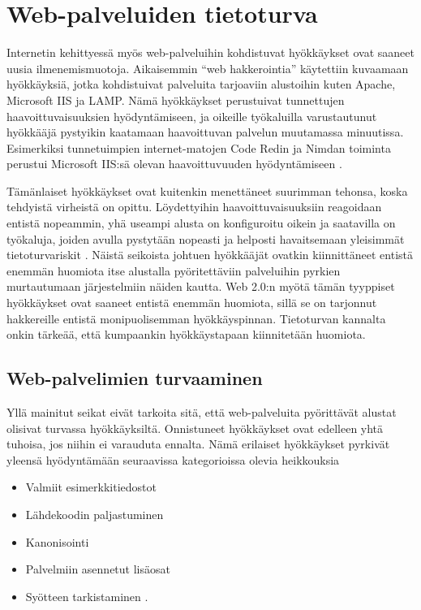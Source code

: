 \section{Web-palveluiden tietoturva}

Internetin kehittyessä myös web-palveluihin kohdistuvat hyökkäykset ovat saaneet
uusia ilmenemismuotoja. Aikaisemmin ``web hakkerointia'' käytettiin kuvaamaan
hyökkäyksiä, jotka kohdistuivat palveluita tarjoaviin alustoihin kuten Apache, 
Microsoft IIS ja LAMP. Nämä hyökkäykset perustuivat tunnettujen haavoittuvaisuuksien
hyödyntämiseen, ja oikeille työkaluilla varustautunut hyökkääjä pystyikin kaatamaan haavoittuvan
palvelun muutamassa minuutissa. Esimerkiksi tunnetuimpien internet-matojen Code Redin ja Nimdan toiminta
perustui Microsoft IIS:sä olevan haavoittuvuuden hyödyntämiseen \cite{Hacking}. 

Tämänlaiset hyökkäykset ovat kuitenkin
menettäneet suurimman tehonsa, koska tehdyistä virheistä on opittu. Löydettyihin haavoittuvaisuuksiin
reagoidaan entistä nopeammin, yhä useampi alusta on konfiguroitu oikein ja saatavilla on työkaluja, joiden
avulla pystytään nopeasti ja helposti havaitsemaan yleisimmät tietoturvariskit \cite{Hacking}. Näistä seikoista johtuen
hyökkääjät ovatkin kiinnittäneet entistä enemmän huomiota itse alustalla pyöritettäviin palveluihin pyrkien 
murtautumaan järjestelmiin näiden kautta. Web 2.0:n myötä tämän tyyppiset hyökkäykset ovat saaneet entistä
enemmän huomiota, sillä se on tarjonnut hakkereille entistä monipuolisemman hyökkäyspinnan. Tietoturvan 
kannalta onkin tärkeää, että kumpaankin hyökkäystapaan kiinnitetään huomiota.

\subsection{Web-palvelimien turvaaminen}

Yllä mainitut seikat eivät tarkoita sitä, että web-palveluita pyörittävät alustat olisivat
turvassa hyökkäyksiltä. Onnistuneet hyökkäykset ovat edelleen yhtä tuhoisa, jos niihin ei varauduta ennalta.
Nämä erilaiset hyökkäykset pyrkivät yleensä hyödyntämään seuraavissa kategorioissa olevia heikkouksia

\begin{itemize}
\item Valmiit esimerkkitiedostot
\item Lähdekoodin paljastuminen
\item Kanonisointi
\item Palvelmiin asennetut lisäosat
\item Syötteen tarkistaminen \cite{Hacking}.
\end{itemize}

